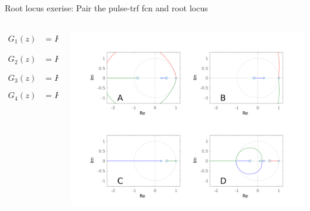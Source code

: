 \documentclass[presentation,aspectratio=169]{beamer}
\begin{document}
\begin{frame}[label={sec:org8888ac4}]{Root locus exerise: Pair the pulse-trf fcn and root locus}
\begin{columns}
\begin{column}{0.35\columnwidth}
 \small
\begin{align*}
  G_1(z) &= K\frac{(z+2.9)(z+0.2)}{(z-1)^2(z-0.3)}\\[3mm]
  G_2(z) &= K\frac{(z-0.5)(z+0.4)}{(z-1)(z-0.3)(z-0.1)}\\[3mm]
  G_3(z) &= K\frac{(z-0.5)(z+0.8)}{(z-1)^2(z-0.3)}\\[3mm]
  G_4(z) &= K \frac{z-0.6}{(z-1)(z-0.3)}
\end{align*}
\end{column}

\begin{column}{0.65\columnwidth}
\begin{center}
\includegraphics[width=1.04\linewidth]{../../matlab/rlocus_2x2-crop}
\end{center}
\end{column}
\end{columns}
\end{frame}
\end{document}
